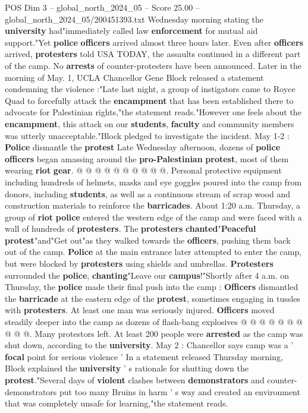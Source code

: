 \begin{textsample}{POS Dim 3 – global\_north\_2024\_05 – Score 25.00 – global\_north\_2024\_05/200451393.txt}
Wednesday morning stating the \textbf{university} had"immediately called law \textbf{enforcement} for mutual aid support."Yet \textbf{police} \textbf{officers} arrived almost three hours later.
Even after \textbf{officers} arrived, \textbf{protesters} told USA TODAY, the assaults continued in a different part of the camp.
No \textbf{arrests} of counter-protesters have been announced.
Later in the morning of May. 1, UCLA Chancellor Gene Block released a statement condemning the violence :"Late last night, a group of instigators came to Royce Quad to forcefully attack the \textbf{encampment} that has been established there to advocate for Palestinian rights,"the statement reads."However one feels about the \textbf{encampment}, this attack on our \textbf{students}, \textbf{faculty} and community members was utterly unacceptable."Block pledged to investigate the incident.
May 1-2 : \textbf{Police} dismantle the \textbf{protest} Late Wednesday afternoon, dozens of \textbf{police} \textbf{officers} began amassing around the \textbf{pro-Palestinian} \textbf{protest}, most of them wearing \textbf{riot} \textbf{gear}. @ @ @ @ @ @ @ @ @ @.
Personal protective equipment including hundreds of helmets, masks and eye goggles poured into the camp from donors, including \textbf{students}, as well as a continuous stream of scrap wood and construction materials to reinforce the \textbf{barricades}.
About 1:20 a.m.
Thursday, a group of \textbf{riot} \textbf{police} entered the western edge of the camp and were faced with a wall of hundreds of \textbf{protesters}.
The \textbf{protesters} \textbf{chanted}"\textbf{Peaceful} \textbf{protest}"and"Get out"as they walked towards the \textbf{officers}, pushing them back out of the camp. \textbf{Police} at the main entrance later attempted to enter the camp, but were blocked by \textbf{protesters} using shields and umbrellas. \textbf{Protesters} surrounded the \textbf{police}, \textbf{chanting}"Leave our \textbf{campus}!"Shortly after 4 a.m. on Thursday, the \textbf{police} made their final push into the camp : \textbf{Officers} dismantled the \textbf{barricade} at the eastern edge of the \textbf{protest}, sometimes engaging in tussles with \textbf{protesters}.
At least one man was seriously injured. \textbf{Officers} moved steadily deeper into the camp as dozens of flash-bang explosives @ @ @ @ @ @ @ @ @ @.
Many protestors left.
At least 200 people were \textbf{arrested} as the camp was shut down, according to the \textbf{university}.
May 2 : Chancellor says camp was a ' \textbf{focal} point for serious violence ' In a statement released Thursday morning, Block explained the \textbf{university} ' s rationale for shutting down the \textbf{protest}."Several days of \textbf{violent} clashes between \textbf{demonstrators} and counter-demonstrators put too many Bruins in harm ' s way and created an environment that was completely unsafe for learning,"the statement reads.

\end{textsample}
